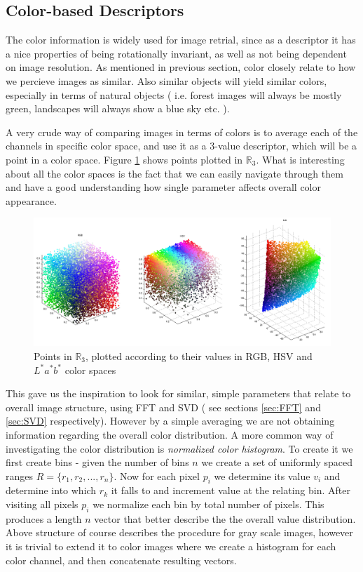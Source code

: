 \documentclass{report}
\begin{document}
\subsection{Color-based Descriptors}
The color information is widely used for image retrial, since as a descriptor it has a nice properties of being rotationally invariant, as well as not being dependent on image resolution. As mentioned in previous section, color closely relate to how we percieve images as similar. Also similar objects will yield similar colors, especially in terms of natural objects ( i.e. forest images will always be mostly green, landscapes will always show a blue sky etc. ). 

A very crude way of comparing images in terms of colors is to average each of the channels in specific color space, and use it as a $3$-value descriptor, which will be a point in a color space. Figure \ref{fig:colSpaces} shows points plotted in $\mathbb{R}_3$. What is interesting about all the color spaces is the fact that we can easily navigate through them and have a good understanding how single parameter affects overall color appearance.

\begin{figure}[hbtp]
\centering
\includegraphics[scale=0.3]{graphics/colorSpaces.png}
\caption{Points in $\mathbb{R}_3$, plotted according to their values in RGB, HSV and $L^*a^*b^*$ color spaces }
\label{fig:colSpaces}
\end{figure}

This gave us the inspiration to look for similar, simple parameters that relate to overall image structure, using FFT and SVD ( see sections \ref{sec:FFT} and \ref{sec:SVD} respectively). However by a simple averaging we are not obtaining information regarding the overall color distribution. A more common way of investigating the color distribution is \textit{normalized color histogram}. To create it we first create bins - given the number of bins $n$ we create a set of uniformly spaced ranges $R = \{r_1, r_2, ..., r_n\}$. Now for each pixel $p_i$ we determine its value $v_i$ and determine into which $r_k$ it falls to and increment value at the relating bin. After visiting all pixels $p_i$ we normalize each bin by total number of pixels. This produces a length $n$ vector that better describe the the overall value distribution. Above structure of course describes the procedure for gray scale images, however it is trivial to extend it to color images where we create a histogram for each color channel, and then concatenate resulting vectors.
\end{document}

